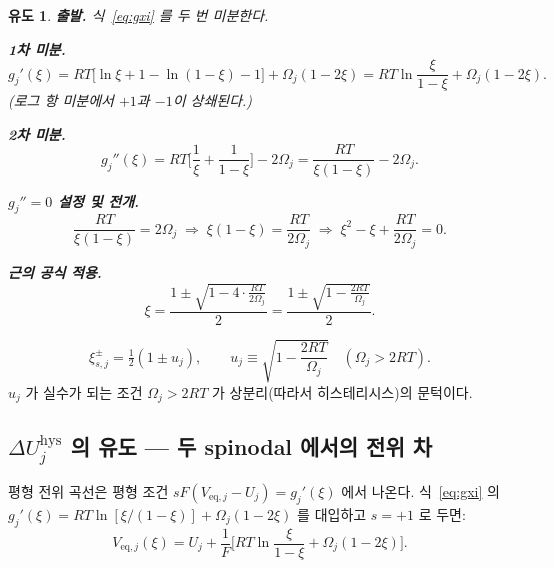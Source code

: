\documentclass[11pt,a4paper]{article}
\newtheorem*{derivebox}{유도}
\newcommand{\eq}{\mathrm{eq}}
\newcommand{\hys}{\mathrm{hys}}
\begin{document}
\begin{derivebox}
\textbf{출발.} 식~\eqref{eq:gxi} 를 두 번 미분한다.

\textbf{1차 미분.}
\begin{equation*}
g_j'(\xi)=RT\Big[\ln\xi+1-\ln(1-\xi)-1\Big]+\Omega_j(1-2\xi)
=RT\ln\frac{\xi}{1-\xi}+\Omega_j(1-2\xi).
\end{equation*}
(로그 항 미분에서 $+1$과 $-1$이 상쇄된다.)

\textbf{2차 미분.}
\begin{equation*}
g_j''(\xi)=RT\Big[\frac{1}{\xi}+\frac{1}{1-\xi}\Big]-2\Omega_j
=\frac{RT}{\xi(1-\xi)}-2\Omega_j.
\end{equation*}

\textbf{$g_j''=0$ 설정 및 전개.}
\begin{equation*}
\frac{RT}{\xi(1-\xi)}=2\Omega_j
\;\Longrightarrow\;
\xi(1-\xi)=\frac{RT}{2\Omega_j}
\;\Longrightarrow\;
\xi^2-\xi+\frac{RT}{2\Omega_j}=0.
\end{equation*}

\textbf{근의 공식 적용.}
\begin{equation*}
\xi=\frac{1\pm\sqrt{1-4\cdot\frac{RT}{2\Omega_j}}}{2}
=\frac{1\pm\sqrt{1-\frac{2RT}{\Omega_j}}}{2}.
\end{equation*}
\end{derivebox}
\begin{equation}
\xi_{s,j}^\pm=\tfrac12(1\pm u_j),\qquad
u_j\equiv\sqrt{1-\frac{2RT}{\Omega_j}}\quad(\Omega_j>2RT).
\label{eq:spinodal}
\end{equation}
$u_j$ 가 실수가 되는 조건 $\Omega_j>2RT$ 가 상분리(따라서 히스테리시스)의 문턱이다.

\subsection{$\Delta U_j^\hys$ 의 유도 — 두 spinodal 에서의 전위 차}

평형 전위 곡선은 평형 조건 $sF(V_{\eq,j}-U_j)=g_j'(\xi)$ 에서 나온다.
식~\eqref{eq:gxi} 의 $g_j'(\xi)=RT\ln[\xi/(1-\xi)]+\Omega_j(1-2\xi)$ 를 대입하고 $s=+1$ 로 두면:
\begin{equation}
V_{\eq,j}(\xi)=U_j+\frac{1}{F}\Big[RT\ln\frac{\xi}{1-\xi}+\Omega_j(1-2\xi)\Big].
\label{eq:Veq}
\end{equation}
\end{document}
